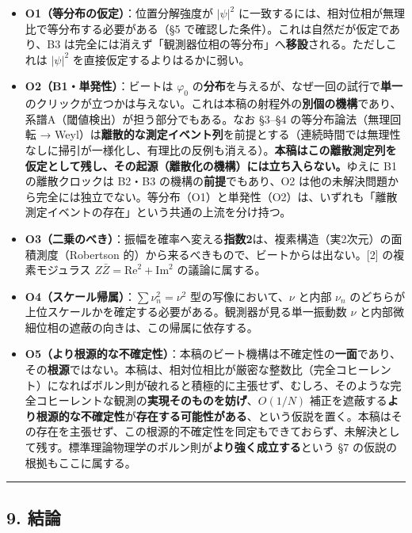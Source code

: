 \documentclass[
]{ltjsarticle}
\providecommand{\tightlist}{%
  \setlength{\itemsep}{0pt}\setlength{\parskip}{0pt}}
\begin{document}
\begin{itemize}
\tightlist
\item
  \textbf{O1（等分布の仮定）}：位置分解強度が \(|\psi|^2\)
  に一致するには、相対位相が無理比で等分布する必要がある（§5
  で確認した条件）。これは自然だが仮定であり、B3
  は完全には消えず「観測器位相の等分布」へ\textbf{移設}される。ただしこれは
  \(|\psi|^2\) を直接仮定するよりはるかに弱い。
\item
  \textbf{O2（B1・単発性）}：ビートは \(\varphi_0\)
  の\textbf{分布}を与えるが、なぜ一回の試行で\textbf{単一}のクリックが立つかは与えない。これは本稿の射程外の\textbf{別個の機構}であり、系譜A（閾値検出）が担う部分でもある。なお
  §3--§4 の等分布論法（無理回転 →
  Weyl）は\textbf{離散的な測定イベント列}を前提とする（連続時間では無理性なしに掃引が一様化し、有理比の反例も消える）。\textbf{本稿はこの離散測定列を仮定として残し、その起源（離散化の機構）には立ち入らない。}ゆえに
  B1 の離散クロックは B2・B3 の機構の\textbf{前提}でもあり、O2
  は他の未解決問題から完全には独立でない。等分布（O1）と単発性（O2）は、いずれも「離散測定イベントの存在」という共通の上流を分け持つ。
\item
  \textbf{O3（二乗のべき）}：振幅を確率へ変える\textbf{指数2}は、複素構造（実2次元）の面積測度（Robertson
  的）から来るべきもので、ビートからは出ない。{[}2{]} の複素モジュラス
  \(Z\bar Z=\mathrm{Re}^2+\mathrm{Im}^2\) の議論に属する。
\item
  \textbf{O4（スケール帰属）}：\(\sum\nu_n^2=\nu^2\)
  型の写像において、\(\nu\) と内部 \(\nu_n\)
  のどちらが上位スケールかを確定する必要がある。観測器が見る単一振動数
  \(\nu\) と内部微細位相の遮蔽の向きは、この帰属に依存する。
\item
  \textbf{O5（より根源的な不確定性）}：本稿のビート機構は不確定性の\textbf{一面}であり、その\textbf{根源}ではない。本稿は、相対位相比が厳密な整数比（完全コヒーレント）になればボルン則が破れると積極的に主張せず、むしろ、そのような完全コヒーレントな観測の\textbf{実現そのものを妨げ}、\(O(1/N)\)
  補正を遮蔽する\textbf{より根源的な不確定性}が\textbf{存在する可能性がある}、という仮説を置く。本稿はその存在を主張せず、この根源的不確定性を同定もできておらず、未解決として残す。標準理論物理学のボルン則が\textbf{より強く成立する}という
  §7 の仮説の根拠もここに属する。
\end{itemize}

\begin{center}\rule{0.5\linewidth}{0.5pt}\end{center}

\subsection{9. 結論}\label{ux7d50ux8ad6}
\end{document}
